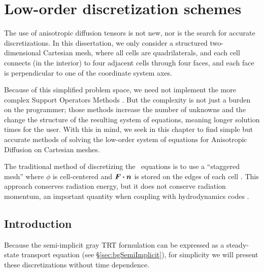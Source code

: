 
\chapter{Low-order discretization schemes} \label{chap:implementation}

The use of anisotropic diffusion tensors is not new, nor is the search for
accurate discretizations. In this dissertation, we only consider a structured
two-dimensional Cartesian mesh, where all cells are quadrilaterals, and each
cell connects (in
the interior) to four adjacent cells through four faces, and each face is
perpendicular to one of the coordinate system axes.

Because of this simplified problem space, we need not implement the more
complex Support Operators Methods \cite{Mor1998,Run2006}. But the complexity is
not just a burden on the programmer; those methods increase the number of
unknowns and the change the structure of the resulting system of equations,
meaning longer solution times for the user. With this in mind, we seek in this
chapter to find simple but accurate methods of solving the low-order system of
equations for Anisotropic Diffusion on Cartesian meshes.

The traditional method of discretizing the \Pone\ equations is to use a
``staggered mesh'' where $\phi$ is cell-centered and $\bm{F}\bm{\cdot} \bm{n}$ is
stored on the edges of each cell \cite{War2003}. This approach conserves
radiation energy, but it does not conserve radiation momentum, an important
quantity when coupling with hydrodynamics codes \cite{Pom1973}.

\section{Introduction}

Because the semi-implicit gray TRT formulation can be expressed as a
steady-state transport equation (see \S\ref{sec:bgSemiImplicit}), for
simplicity we will present these discretizations without time dependence.

